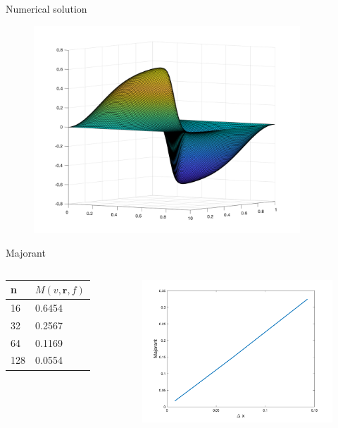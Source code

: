 \documentclass{beamer}
\begin{document}
    \begin{frame}{Numerical solution}
        \begin{figure}
            \includegraphics[width=10cm]{solution.png}
        \end{figure}
    \end{frame}

    \begin{frame}{Majorant}
        \begin{columns}
            \begin{table}[]
                \begin{tabular}{l|l}
                \textbf{n} & $M(v, \bm{r}, f)$ \\ \hline
                16         & 0.6454            \\
                32         & 0.2567            \\
                64         & 0.1169            \\
                128        & 0.0554           
                \end{tabular}
                \end{table}
            \begin{figure}
                \includegraphics[scale=0.2]{majorant.png}
            \end{figure}
        \end{columns}
    \end{frame}
\end{document}
